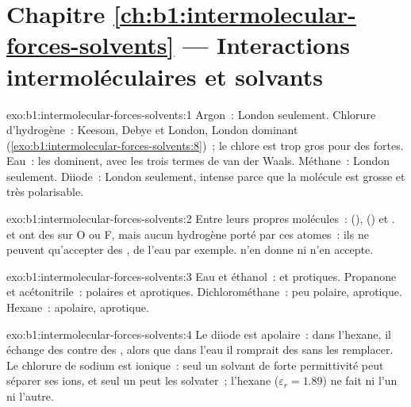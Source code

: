 \section*{Chapitre \ref{ch:b1:intermolecular-forces-solvents} --- Interactions intermoléculaires et solvants}

\begin{solution}{exo:b1:intermolecular-forces-solvents:1}
Argon~: London seulement. Chlorure d'hydrogène~: Keesom, Debye et
London, London dominant (\cref{exo:b1:intermolecular-forces-solvents:8})~;
le chlore est trop gros pour des  fortes. Eau~: les
 dominent, avec les trois termes de van der Waals.
Méthane~: London seulement. Diiode~: London seulement, intense parce que
la molécule est grosse et très polarisable.
\end{solution}

\begin{solution}{exo:b1:intermolecular-forces-solvents:2}
Entre leurs propres molécules~:  (), 
() et .  et  ont des  sur O ou F, mais aucun hydrogène porté par ces atomes~: ils ne
peuvent qu'accepter des , de l'eau par exemple.
 n'en donne ni n'en accepte.
\end{solution}

\begin{solution}{exo:b1:intermolecular-forces-solvents:3}
Eau et éthanol~:  et protiques. Propanone et
acétonitrile~: polaires et aprotiques. Dichlorométhane~: peu polaire, aprotique. Hexane~:
apolaire, aprotique.
\end{solution}

\begin{solution}{exo:b1:intermolecular-forces-solvents:4}
Le diiode est apolaire~: dans l'hexane, il échange des  contre des , alors que dans l'eau il
romprait des  sans les remplacer. Le chlorure de
sodium est ionique~: seul un solvant de forte permittivité peut séparer
ses ions, et seul un  peut les solvater~; l'hexane
($\varepsilon_r = 1.89$) ne fait ni l'un ni l'autre.
\end{solution}

